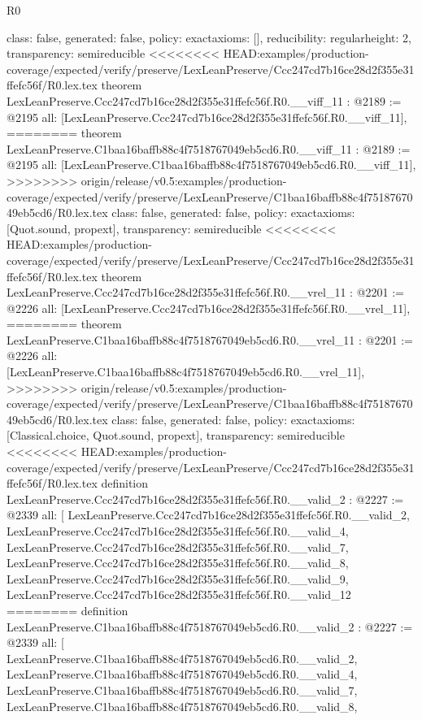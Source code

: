 \begin{lexlean}{R0}
\begin{coremodule}
{{{{{{{{{{{{{{{{{{{{{{{{{{{{{{{{{{{{{{{{{{  class: false,
  generated: false,
  policy: exact{axioms: []},
  reducibility: regular{height: 2},
  transparency: semireducible
}
<<<<<<<< HEAD:examples/production-coverage/expected/verify/preserve/LexLeanPreserve/Ccc247cd7b16ce28d2f355e31ffefc56f/R0.lex.tex
theorem LexLeanPreserve.Ccc247cd7b16ce28d2f355e31ffefc56f.R0.__viff_11 : @2189 := @2195 {
  all: [LexLeanPreserve.Ccc247cd7b16ce28d2f355e31ffefc56f.R0.__viff_11],
========
theorem LexLeanPreserve.C1baa16baffb88c4f7518767049eb5cd6.R0.__viff_11 : @2189 := @2195 {
  all: [LexLeanPreserve.C1baa16baffb88c4f7518767049eb5cd6.R0.__viff_11],
>>>>>>>> origin/release/v0.5:examples/production-coverage/expected/verify/preserve/LexLeanPreserve/C1baa16baffb88c4f7518767049eb5cd6/R0.lex.tex
  class: false,
  generated: false,
  policy: exact{axioms: [Quot.sound, propext]},
  transparency: semireducible
}
<<<<<<<< HEAD:examples/production-coverage/expected/verify/preserve/LexLeanPreserve/Ccc247cd7b16ce28d2f355e31ffefc56f/R0.lex.tex
theorem LexLeanPreserve.Ccc247cd7b16ce28d2f355e31ffefc56f.R0.__vrel_11 : @2201 := @2226 {
  all: [LexLeanPreserve.Ccc247cd7b16ce28d2f355e31ffefc56f.R0.__vrel_11],
========
theorem LexLeanPreserve.C1baa16baffb88c4f7518767049eb5cd6.R0.__vrel_11 : @2201 := @2226 {
  all: [LexLeanPreserve.C1baa16baffb88c4f7518767049eb5cd6.R0.__vrel_11],
>>>>>>>> origin/release/v0.5:examples/production-coverage/expected/verify/preserve/LexLeanPreserve/C1baa16baffb88c4f7518767049eb5cd6/R0.lex.tex
  class: false,
  generated: false,
  policy: exact{axioms: [Classical.choice, Quot.sound, propext]},
  transparency: semireducible
}
<<<<<<<< HEAD:examples/production-coverage/expected/verify/preserve/LexLeanPreserve/Ccc247cd7b16ce28d2f355e31ffefc56f/R0.lex.tex
definition LexLeanPreserve.Ccc247cd7b16ce28d2f355e31ffefc56f.R0.__valid_2 : @2227 := @2339 {
  all: [
    LexLeanPreserve.Ccc247cd7b16ce28d2f355e31ffefc56f.R0.__valid_2,
    LexLeanPreserve.Ccc247cd7b16ce28d2f355e31ffefc56f.R0.__valid_4,
    LexLeanPreserve.Ccc247cd7b16ce28d2f355e31ffefc56f.R0.__valid_7,
    LexLeanPreserve.Ccc247cd7b16ce28d2f355e31ffefc56f.R0.__valid_8,
    LexLeanPreserve.Ccc247cd7b16ce28d2f355e31ffefc56f.R0.__valid_9,
    LexLeanPreserve.Ccc247cd7b16ce28d2f355e31ffefc56f.R0.__valid_12
========
definition LexLeanPreserve.C1baa16baffb88c4f7518767049eb5cd6.R0.__valid_2 : @2227 := @2339 {
  all: [
    LexLeanPreserve.C1baa16baffb88c4f7518767049eb5cd6.R0.__valid_2,
    LexLeanPreserve.C1baa16baffb88c4f7518767049eb5cd6.R0.__valid_4,
    LexLeanPreserve.C1baa16baffb88c4f7518767049eb5cd6.R0.__valid_7,
    LexLeanPreserve.C1baa16baffb88c4f7518767049eb5cd6.R0.__valid_8,
}}}}}}}}}}}}}}}}}}}}}}}}}}}}}}}}}}}}}}}}}}}}}
\end{coremodule}
\end{lexlean}
